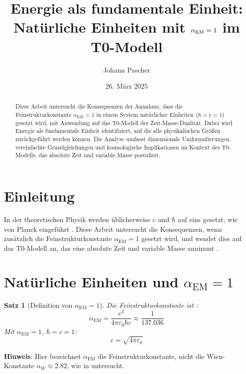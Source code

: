 \documentclass{article}
\title{Energie als fundamentale Einheit: \\ Natürliche Einheiten mit \(\alphaEM = 1\) im T0-Modell}
\author{Johann Pascher}
\date{26. März 2025}
\newtheorem{theorem}{Satz}[section]
\newcommand{\alphaEM}{\alpha_{\text{EM}}}
\begin{document}
	
	\maketitle
	
	\begin{abstract}
		Diese Arbeit untersucht die Konsequenzen der Annahme, dass die Feinstrukturkonstante \(\alphaEM = 1\) in einem System natürlicher Einheiten (\(\hbar = c = 1\)) gesetzt wird, mit Anwendung auf das T0-Modell der Zeit-Masse-Dualität. Dabei wird Energie als fundamentale Einheit identifiziert, auf die alle physikalischen Größen zurückgeführt werden können. Die Analyse umfasst dimensionale Umformulierungen, vereinfachte Grundgleichungen und kosmologische Implikationen im Kontext des T0-Modells, das absolute Zeit und variable Masse postuliert.
	\end{abstract}
	
	\tableofcontents
	\newpage
	
	\section{Einleitung}
	In der theoretischen Physik werden üblicherweise \(c\) und \(\hbar\) auf eins gesetzt, wie von Planck eingeführt \cite{Planck1899}. Diese Arbeit untersucht die Konsequenzen, wenn zusätzlich die Feinstrukturkonstante \(\alphaEM = 1\) gesetzt wird, und wendet dies auf das T0-Modell an, das eine absolute Zeit und variable Masse annimmt \cite{pascher_galaxies_2025}.
	
	\section{Natürliche Einheiten und \(\alphaEM = 1\)}
	\begin{theorem}[Definition von \(\alphaEM = 1\)]
		Die Feinstrukturkonstante ist \cite{Feynman1985}:
		\begin{equation}
			\alphaEM = \frac{e^2}{4\pi\varepsilon_0 \hbar c} \approx \frac{1}{137.036}
		\end{equation}
		Mit \(\alphaEM = 1\), \(\hbar = c = 1\):
		\begin{equation}
			e = \sqrt{4\pi\varepsilon_0}
		\end{equation}
	\end{theorem}
	
	\textbf{Hinweis}: Hier bezeichnet \(\alphaEM\) die Feinstrukturkonstante, nicht die Wien-Konstante \(\alpha_W \approx 2.82\), wie in \cite{pascher_temp_2025} untersucht.
	
\end{document}
